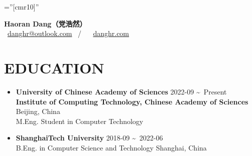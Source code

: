 \documentclass[a4paper,10pt]{ctexart} %
\begin{document}
\pagestyle{empty} %

\font\fb=''[cmr10]'' %

\newenvironment{keepsection}{\par\noindent\minipage{\textwidth}}{\endminipage\par}

\newcommand{\datetlide}{\textasciitilde \ }



\begin{keepsection}
\begin{center}
    \textbf{{\LARGE Haoran Dang}{\large（党浩然）}} \\
     \  \href{mailto:danghr@outlook.com}{danghr@outlook.com} \  / \   \  \href{https://www.danghr.com}{danghr.com} \\
\end{center}
\end{keepsection}


\begin{keepsection}

\section{EDUCATION}

\begin{itemize}
    \item \textbf{University of Chinese Academy of Sciences} \hfill 2022-09 \datetlide Present \\
    \textbf{Institute of Computing Technology, Chinese Academy of Sciences} \hfill Beijing, China \\
    M.Eng. Student in Computer Technology  
    \item \textbf{ShanghaiTech University} \hfill 2018-09 \datetlide 2022-06 \\
    B.Eng. in Computer Science and Technology  \hfill Shanghai, China \\
\end{itemize}

\end{keepsection}
\end{document}
